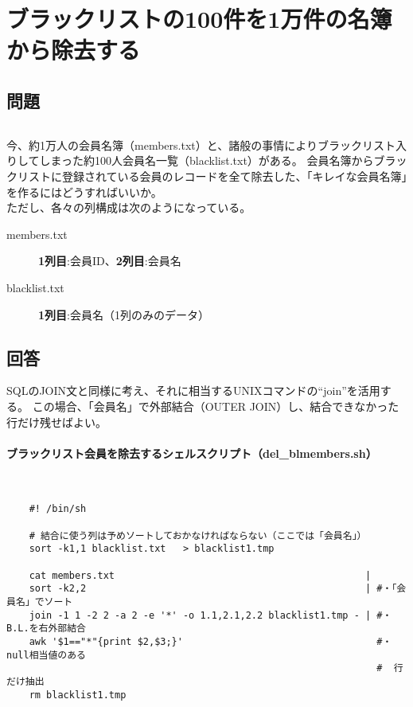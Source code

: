 \section{ブラックリストの100件を1万件の名簿から除去する}
\label{recipe:blacklist}

\subsection*{問題}
\noindent
$\!\!\!\!\!$
\begin{grshfboxit}{160.0mm}
	今、約1万人の会員名簿（members.txt）と、諸般の事情によりブラックリスト入りしてしまった約100人会員名一覧（blacklist.txt）がある。
	会員名簿からブラックリストに登録されている会員のレコードを全て除去した、「キレイな会員名簿」を作るにはどうすればいいか。 \\
	ただし、各々の列構成は次のようになっている。
	\begin{description}
	  \item[members.txt] \textbf{1列目}:会員ID、\textbf{2列目}:会員名
	  \item[blacklist.txt ] \textbf{1列目}:会員名（1列のみのデータ）
	\end{description}
\end{grshfboxit}

\subsection*{回答}
SQLのJOIN文と同様に考え、それに相当するUNIXコマンドの``join''を活用する。
この場合、「会員名」で外部結合（OUTER JOIN）し、結合できなかった行だけ残せばよい。

\paragraph{ブラックリスト会員を除去するシェルスクリプト（del\_{}blmembers.sh）} 　\\
\begin{frameboxit}{160.0mm}
\begin{verbatim}
	#! /bin/sh

	# 結合に使う列は予めソートしておかなければならない（ここでは「会員名」）
	sort -k1,1 blacklist.txt   > blacklist1.tmp

	cat members.txt                                            |
	sort -k2,2                                                 | #・「会員名」でソート
	join -1 1 -2 2 -a 2 -e '*' -o 1.1,2.1,2.2 blacklist1.tmp - | #・B.L.を右外部結合
	awk '$1=="*"{print $2,$3;}'                                  #・null相当値のある
	                                                             #  行だけ抽出
	rm blacklist1.tmp
\end{verbatim}
\end{frameboxit}


